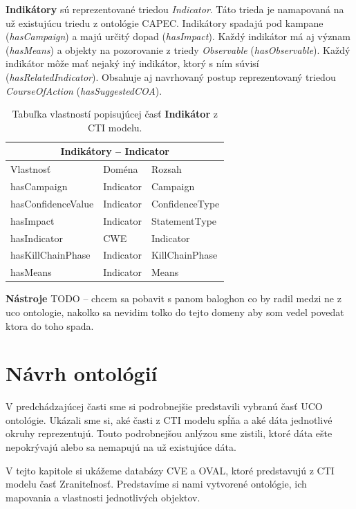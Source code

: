 \documentclass[12pt, a4paper, oneside]{book}
\begin{document}
\textbf{Indikátory} sú reprezentované triedou \textit{Indicator}. Táto trieda je namapovaná na už existujúcu triedu z ontológie CAPEC. Indikátory spadajú pod kampane (\textit{hasCampaign}) a majú určitý dopad (\textit{hasImpact}). Každý indikátor má aj význam (\textit{hasMeans}) a objekty na pozorovanie z triedy \textit{Observable} (\textit{hasObservable}). Každý indikátor môže mať nejaký iný indikátor, ktorý s ním súvisí (\textit{hasRelatedIndicator}). Obsahuje aj navrhovaný postup reprezentovaný triedou \textit{CourseOfAction} (\textit{hasSuggestedCOA}).
\begin{table}[hbt!]
\centering
\begin{tabular}{ |p{5cm}||p{3cm}|p{3cm}|  }
 \hline
 \multicolumn{3}{|c|}{Indikátory -- Indicator} \\
 \hline
 Vlastnosť & Doména & Rozsah\\
 \hline
 hasCampaign & Indicator & Campaign\\
 hasConfidenceValue & Indicator & ConfidenceType\\
 hasImpact & Indicator & StatementType\\
 hasIndicator & CWE & Indicator\\
 hasKillChainPhase & Indicator & KillChainPhase\\
 hasMeans & Indicator & Means\\
 \hline
\end{tabular}
\caption{Tabuľka vlastností popisujúcej časť \textbf{Indikátor} z CTI modelu.}
\label{tab:template}
\end{table}


\textbf{Nástroje}
TODO -- chcem sa pobavit s panom baloghon co by radil medzi ne z uco ontologie, nakolko sa nevidim tolko do tejto domeny aby som vedel povedat ktora do toho spada.


\chapter{Návrh ontológií}
V predchádzajúcej časti sme si podrobnejšie predstavili vybranú časť UCO ontológie. Ukázali sme si, aké časti z CTI modelu spĺňa a aké dáta jednotlivé okruhy reprezentujú. Touto podrobnejšou anlýzou sme zistili, ktoré dáta ešte nepokrývajú alebo sa nemapujú na už existujúce dáta. 


V tejto kapitole si ukážeme databázy CVE a OVAL, ktoré predstavujú z CTI modelu časť Zraniteľnosť. Predstavíme si nami vytvorené ontológie, ich mapovania a vlastnosti jednotlivých objektov.
\end{document}
